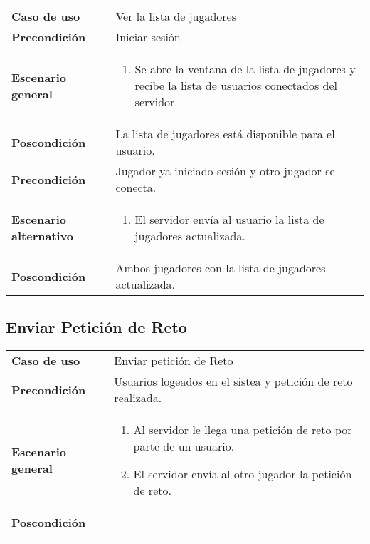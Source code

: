 {\footnotesize
\begin{tabularx}{0.95\textwidth}{p{}|X}

\textbf{Caso de uso} & Ver la lista de jugadores \\

\textbf{Precondición} & Iniciar sesión \\

\textbf{Escenario general} & \begin{enumerate}
\item Se abre la ventana de la lista de jugadores y recibe la lista de
usuarios conectados del servidor.

\end{enumerate} \\

\textbf{Poscondición} & La lista de jugadores está disponible para el usuario.\\

\textbf{Precondición} & Jugador ya iniciado sesión y otro jugador se conecta.\\
\textbf{Escenario alternativo} & \begin{enumerate}
\item El servidor envía al usuario la lista de jugadores actualizada.
\end{enumerate}\\
\textbf{Poscondición}& Ambos jugadores con la lista de jugadores actualizada.\\
\end{tabularx}
}


\subsection{Enviar Petición de Reto}

{\footnotesize
\begin{tabularx}{0.95\textwidth}{p{}|X}

\textbf{Caso de uso} & Enviar petición de Reto\\

\textbf{Precondición} & Usuarios logeados en el sistea y petición de reto realizada. \\

\textbf{Escenario general} & \begin{enumerate}

\item Al servidor le llega una petición de reto por parte de un usuario.
\item El servidor envía al otro jugador la petición de reto.

\end{enumerate} \\

\textbf{Poscondición} &  \\ \\

\end{tabularx}
}


